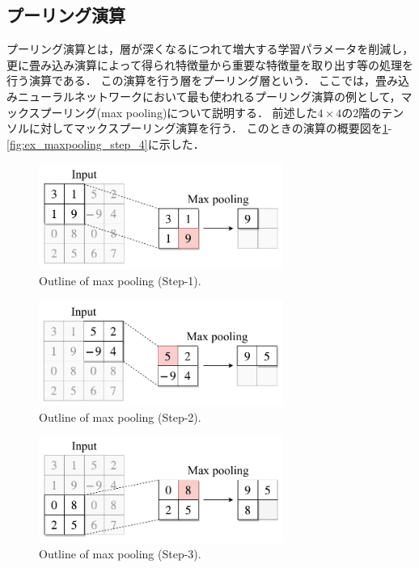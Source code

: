 \subsection{プーリング演算}
    プーリング演算とは，層が深くなるにつれて増大する学習パラメータを削減し，更に畳み込み演算によって得られ特徴量から重要な特徴量を取り出す等の処理を行う演算である．
    この演算を行う層をプーリング層という．
    ここでは，畳み込みニューラルネットワークにおいて最も使われるプーリング演算の例として，マックスプーリング(max pooling)について説明する．
    前述した$4 \times 4$の2階のテンソルに対してマックスプーリング演算を行う．
    このときの演算の概要図を\ref{fig:ex_maxpooling_step_1}-\ref{fig:ex_maxpooling_step_4}に示した．
    \begin{figure}[ht]
      \centering
      \includegraphics[width=8cm]{8_appendix/img/max_pooling_step1.pdf}
      \caption{Outline of max pooling (Step-1).}
      \label{fig:ex_maxpooling_step_1}
    \end{figure}
    \begin{figure}[ht]
      \centering
      \includegraphics[width=8cm]{8_appendix/img/max_pooling_step2.pdf}
      \caption{Outline of max pooling (Step-2).}
      \label{fig:ex_maxpooling_step_2}
    \end{figure}
    \begin{figure}[ht]
      \centering
      \includegraphics[width=8cm]{8_appendix/img/max_pooling_step3.pdf}
      \caption{Outline of max pooling (Step-3).}
      \label{fig:ex_maxpooling_step_3}
    \end{figure}
